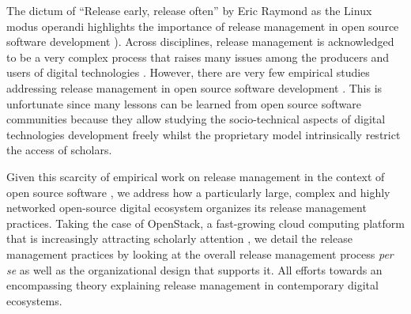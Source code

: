 \documentclass[dvipsnames]{interact}
\theoremstyle{plain}\newtheorem{theorem}{Theorem}[section]
\theoremstyle{definition}
\theoremstyle{remark}
\begin{document}




The dictum of ``Release early, release often'' by Eric Raymond as the Linux modus operandi \citep{Raymond1999,Raymond2001}
highlights the importance of release management in open source software development  \citep[see][]{Aberdour2007,SharmaSugumaran_et_al2002,MichlmayrFitzgerald_et_al2015}).  
Across disciplines, release management is acknowledged to be a very complex process that raises many issues among the producers and users of digital technologies 
\citep{XuBrinkkemper2007,AdamsBellomo_et_al2015,BarqawiSyed_et_al2016,ChoudharyZhang2015}.  However, there are very few empirical studies addressing 
release management in open source software development \citep{MichlmayrFitzgerald_et_al2015,PooCaamano2016,Teixeira2017}. 
This is unfortunate since many lessons can be learned from open source software communities \citep{OReilly1999,SpinellisSzyperski2004,Fitzgerald2011} because they allow studying the socio-technical aspects of digital technologies development freely whilst the proprietary model intrinsically restrict the access of scholars.  


Given this scarcity of empirical work on release management in the context of open source software \citep{MichlmayrFitzgerald_et_al2015,PooCaamanoKnauss_et_al2017,Teixeira2017},
we address how a particularly large, complex and highly networked open-source digital ecosystem organizes its release management practices. Taking the case of OpenStack, a fast-growing cloud computing platform that is increasingly attracting scholarly attention    \citep[e.g.,][]{CorradiFanelli_et_al2014,CarilloBernard2015,teixeira_et_al_icis2016,armisen2016formative,MalikAhmed_et_al2017}, we detail the release management practices by looking at the overall release management process \textit{per se} as well as the organizational design that supports it. All efforts towards an encompassing theory explaining release management in contemporary digital ecosystems.  
\end{document}
